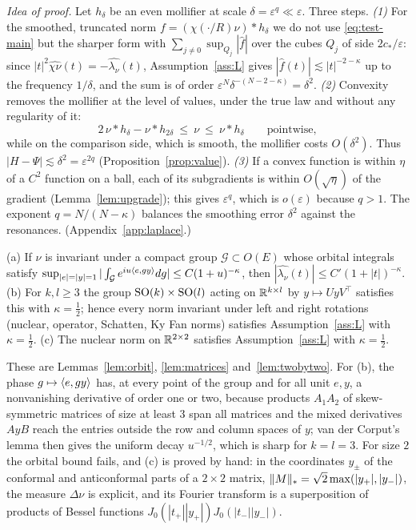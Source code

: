 \documentclass[anon,12pt]{colt2026}
\begin{document}
\noindent\emph{Idea of proof.} Let $h_\delta$ be an even mollifier at scale $\delta=\varepsilon^{q}\ll\varepsilon$. Three
steps. \emph{(1)} For the smoothed, truncated norm $f=(\chi(\cdot/R)\nu)*h_\delta$ we do not use \eqref{eq:test-main} but
the sharper form with $\sum_{j\ne0}\sup_{Q_j}|\widehat f|$ over the cubes $Q_j$ of side $2c_\ast/\varepsilon$: since
$|t|^2\widehat{\chi\nu}(t)=-\widehat{\lambda_\nu}(t)$, Assumption~\ref{ass:L} gives $|\widehat f(t)|\lesssim|t|^{-2-\kappa}$
up to the frequency $1/\delta$, and the sum is of order $\varepsilon^{N}\delta^{-(N-2-\kappa)}=\delta^2$. \emph{(2)} Convexity
removes the mollifier at the level of values, under the true law and without any regularity of it:
\begin{equation}\label{eq:sandwich-main}
2\,\nu*h_\delta-\nu*h_{2\delta}\ \le\ \nu\ \le\ \nu*h_\delta\qquad\text{pointwise},
\end{equation}
while on the comparison side, which is smooth, the mollifier costs $O(\delta^2)$. Thus
$|H-\Psi|\lesssim\delta^2=\varepsilon^{2q}$ (Proposition~\ref{prop:value}). \emph{(3)} If a convex function is within
$\eta$ of a $C^2$ function on a ball, each of its subgradients is within $O(\sqrt\eta)$ of the gradient
(Lemma~\ref{lem:upgrade}); this gives $\varepsilon^{q}$, which is $o(\varepsilon)$ because $q>1$. The exponent
$q=N/(N-\kappa)$ balances the smoothing error $\delta^2$ against the resonances. (Appendix~\ref{app:laplace}.)

\begin{lemma}\label{lem:sym-main}
\textup{(a)} If $\nu$ is invariant under a compact group $\mathcal G\subset O(E)$ whose orbital integrals satisfy
$\sup_{|e|=|y|=1}|\int_{\mathcal G}e^{iu\langle e, gy\rangle}dg|\le C(1+u)^{-\kappa}$, then $|\widehat{\lambda_\nu}(t)|\le C'(1+|t|)^{-\kappa}$.
\textup{(b)} For $k,l\ge3$ the group $\mathrm{SO}(k)\times\mathrm{SO}(l)$ acting on $\mathbb{R}^{k\times l}$ by $y\mapsto UyV^\top$ satisfies this
with $\kappa=\frac12$; hence every norm invariant under left and right rotations (nuclear, operator, Schatten, Ky Fan
norms) satisfies Assumption~\ref{ass:L} with $\kappa=\frac12$. \textup{(c)} The nuclear norm on $\mathbb{R}^{2\times2}$ satisfies
Assumption~\ref{ass:L} with $\kappa=\frac12$.
\end{lemma}

These are Lemmas~\ref{lem:orbit}, \ref{lem:matrices} and~\ref{lem:twobytwo}. For (b), the phase
$g\mapsto\langle e, gy\rangle$ has, at every point of the group and for all unit $e,y$, a nonvanishing derivative of order one
or two, because products $A_1A_2$ of skew-symmetric matrices of size at least $3$ span all matrices and the mixed
derivatives $AyB$ reach the entries outside the row and column spaces of $y$; van der Corput's lemma then gives the
uniform decay $u^{-1/2}$, which is sharp for $k=l=3$. For size $2$ the orbital bound fails, and (c) is proved by hand:
in the coordinates $y_\pm$ of the conformal and anticonformal parts of a $2\times2$ matrix,
$\|M\|_{*}=\sqrt2\max(|y_+|,|y_-|)$, the measure $\Delta\nu$ is explicit, and its Fourier transform is a superposition of
products of Bessel functions $J_0(|t_+||y_+|)J_0(|t_-||y_-|)$.
\end{document}
